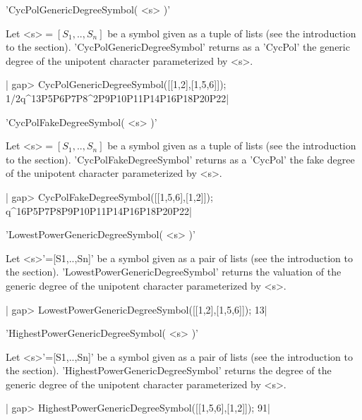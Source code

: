 'CycPolGenericDegreeSymbol( <s> )'

Let <s>$=[S_1,..,S_n]$  be a symbol given  as a tuple of  lists (see the
introduction to  the section). 'CycPolGenericDegreeSymbol' returns  as a
'CycPol' the generic degree of  the unipotent character parameterized by
<s>.

|    gap> CycPolGenericDegreeSymbol([[1,2],[1,5,6]]);
    1/2q^13P5P6P7P8^2P9P10P11P14P16P18P20P22|

%
%

'CycPolFakeDegreeSymbol( <s> )'

Let <s>$=[S_1,..,S_n]$  be a symbol given  as a tuple of  lists (see the
introduction  to the  section).  'CycPolFakeDegreeSymbol'  returns as  a
'CycPol' the  fake degree  of the  unipotent character  parameterized by
<s>.

|    gap> CycPolFakeDegreeSymbol([[1,5,6],[1,2]]);
    q^16P5P7P8P9P10P11P14P16P18P20P22|

%
%

'LowestPowerGenericDegreeSymbol( <s> )'

Let  <s>'=[S1,..,Sn]' be  a symbol  given as  a pair  of lists  (see the
introduction to  the section).  'LowestPowerGenericDegreeSymbol' returns
the  valuation  of  the  generic   degree  of  the  unipotent  character
parameterized by <s>.

|    gap> LowestPowerGenericDegreeSymbol([[1,2],[1,5,6]]);
    13|

%
%

'HighestPowerGenericDegreeSymbol( <s> )'

Let  <s>'=[S1,..,Sn]'  be  a  symbol  given as  a  pair  of  lists  (see
the  introduction  to  the  section).  'HighestPowerGenericDegreeSymbol'
returns  the degree  of the  generic degree  of the  unipotent character
parameterized by <s>.

|    gap> HighestPowerGenericDegreeSymbol([[1,5,6],[1,2]]);
    91|

